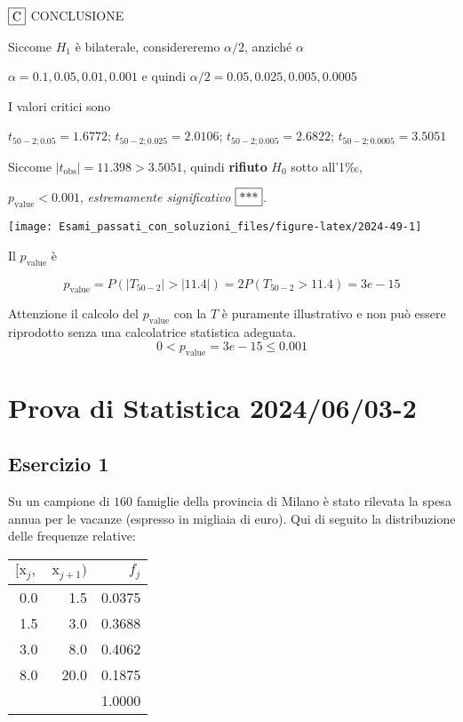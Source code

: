 \documentclass[
  11pt,
]{book}
\theoremstyle{mytheoremstyle}
\theoremstyle{mydefstyle}
\newenvironment{sol}
  {
  \begin{tcolorbox}[enhanced,breakable,arc=0.1mm,boxrule=1pt,colback=white,colframe=iblue,
  title=\bf \fontfamily{lmss}\selectfont \hspace{.5 cm} Soluzione,drop fuzzy shadow]

}{
\end{tcolorbox}
  }
\begin{document}
\begin{sol}
\(\fbox{C}\) CONCLUSIONE

Siccome \(H_1\) è bilaterale, considereremo \(\alpha/2\),
anziché \(\alpha\)

\(\alpha=0.1, 0.05, 0.01, 0.001\) e quindi \(\alpha/2=0.05, 0.025, 0.005, 0.0005\)

I valori critici sono

\(t_{50-2;0.05}=1.6772\); \(t_{50-2;0.025}=2.0106\); \(t_{50-2;0.005}=2.6822\); \(t_{50-2;0.0005}=3.5051\)

Siccome \(|t_\text{obs}|=11.398>3.5051\), quindi \textbf{rifiuto} \(H_0\) sotto all'1‰,

\(p_\text{value}<0.001\), \emph{estremamente significativo} \(\fbox{***}\).

\begin{center}\texttt{[image: Esami\_passati\_con\_soluzioni\_files/figure-latex/2024-49-1]} \end{center}

Il \(p_{\text{value}}\) è

\[ p_{\text{value}} = P(|T_{50-2}|>|11.4|)=2P(T_{50-2}>11.4)=3e-15 \]

Attenzione il calcolo del \(p_\text{value}\) con la \(T\) è puramente illustrativo e non può essere riprodotto senza una calcolatrice statistica adeguata.\[
 0 < p_\text{value}= 3e-15 \leq 0.001 
\]

\end{sol}

\section{Prova di Statistica 2024/06/03-2}\label{prova-di-statistica-20240603-2}

\subsection{Esercizio 1}\label{esercizio-1-36}

Su un campione di \(160\) famiglie della provincia di Milano è stato rilevata la spesa annua per le vacanze (espresso in migliaia di euro). Qui di seguito la distribuzione delle frequenze relative:

\begin{table}[H]
\centering
\begin{tabular}{rrr}
\toprule
$[\text{x}_j,$ & $\text{x}_{j+1})$ & $f_j$\\
\midrule
0.0 & 1.5 & 0.0375\\
1.5 & 3.0 & 0.3688\\
3.0 & 8.0 & 0.4062\\
8.0 & 20.0 & 0.1875\\
 &  & 1.0000\\
\bottomrule
\end{tabular}
\end{table}
\end{document}
